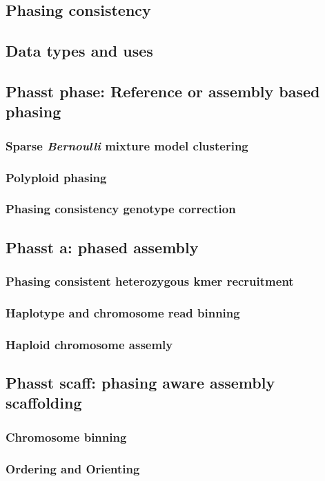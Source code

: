 \subsection{Phasing consistency}

\subsection{Data types and uses}


\subsection{Phasst phase: Reference or assembly based phasing}
\subsubsection{Sparse \textit{Bernoulli} mixture model clustering}
\subsubsection{Polyploid phasing}
\subsubsection{Phasing consistency genotype correction}
\subsection{Phasst a: phased assembly}
\subsubsection{Phasing consistent heterozygous kmer recruitment}
\subsubsection{Haplotype and chromosome read binning}
\subsubsection{Haploid chromosome assemly}
\subsection{Phasst scaff: phasing aware assembly scaffolding}
\subsubsection{Chromosome binning}
\subsubsection{Ordering and Orienting}


